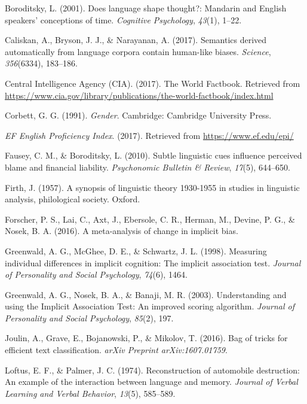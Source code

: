 \documentclass[man,floatsintext]{apa6}
\theoremstyle{definition}
\theoremstyle{definition}
\theoremstyle{definition}
\theoremstyle{remark}
\begin{document}
\hypertarget{ref-boroditsky2001does}{}
Boroditsky, L. (2001). Does language shape thought?: Mandarin and
English speakers' conceptions of time. \emph{Cognitive Psychology},
\emph{43}(1), 1--22.

\hypertarget{ref-caliskan2017semantics}{}
Caliskan, A., Bryson, J. J., \& Narayanan, A. (2017). Semantics derived
automatically from language corpora contain human-like biases.
\emph{Science}, \emph{356}(6334), 183--186.

\hypertarget{ref-ciafactbook}{}
Central Intelligence Agency (CIA). (2017). The World Factbook. Retrieved
from
\url{https://www.cia.gov/library/publications/the-world-factbook/index.html}

\hypertarget{ref-corbett1991}{}
Corbett, G. G. (1991). \emph{Gender}. Cambridge: Cambridge University
Press.

\hypertarget{ref-epi}{}
\emph{EF English Proficiency Index}. (2017). Retrieved from
\url{https://www.ef.edu/epi/}

\hypertarget{ref-fausey2010subtle}{}
Fausey, C. M., \& Boroditsky, L. (2010). Subtle linguistic cues
influence perceived blame and financial liability. \emph{Psychonomic
Bulletin \& Review}, \emph{17}(5), 644--650.

\hypertarget{ref-firth1957synopsis}{}
Firth, J. (1957). A synopsis of linguistic theory 1930-1955 in studies
in linguistic analysis, philological society. Oxford.

\hypertarget{ref-forscher2016meta}{}
Forscher, P. S., Lai, C., Axt, J., Ebersole, C. R., Herman, M., Devine,
P. G., \& Nosek, B. A. (2016). A meta-analysis of change in implicit
bias.

\hypertarget{ref-greenwald1998measuring}{}
Greenwald, A. G., McGhee, D. E., \& Schwartz, J. L. (1998). Measuring
individual differences in implicit cognition: The implicit association
test. \emph{Journal of Personality and Social Psychology}, \emph{74}(6),
1464.

\hypertarget{ref-greenwald2003understanding}{}
Greenwald, A. G., Nosek, B. A., \& Banaji, M. R. (2003). Understanding
and using the Implicit Association Test: An improved scoring algorithm.
\emph{Journal of Personality and Social Psychology}, \emph{85}(2), 197.

\hypertarget{ref-joulin2016bag}{}
Joulin, A., Grave, E., Bojanowski, P., \& Mikolov, T. (2016). Bag of
tricks for efficient text classification. \emph{arXiv Preprint
arXiv:1607.01759}.

\hypertarget{ref-loftus1974reconstruction}{}
Loftus, E. F., \& Palmer, J. C. (1974). Reconstruction of automobile
destruction: An example of the interaction between language and memory.
\emph{Journal of Verbal Learning and Verbal Behavior}, \emph{13}(5),
585--589.
\end{document}
